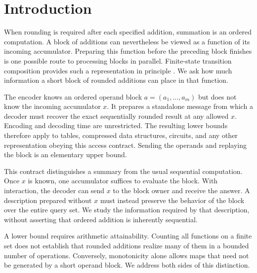 \documentclass[11pt,reqno]{amsart}
\theoremstyle{definition}
\theoremstyle{remark}
\numberwithin{equation}{section}
\begin{document}
\section{Introduction}\label{sec:introduction}

When rounding is required after each specified addition, summation is an
ordered computation. A block of additions can nevertheless be viewed as a
function of its incoming accumulator. Preparing this function before the
preceding block finishes is one possible route to processing blocks in
parallel. Finite-state transition composition provides such a representation
in principle \cite{ref1,ref2}. We ask how much information a short block of rounded additions can place
in that function.

The encoder knows an ordered operand block $a=(a_1,\ldots,a_m)$ but does not
know the incoming accumulator $x$. It prepares a standalone message from which
a decoder must recover the exact sequentially rounded result at any allowed
$x$. Encoding and decoding time are unrestricted. The resulting lower bounds
therefore apply to tables, compressed data structures, circuits, and any other
representation obeying this access contract. Sending the operands and
replaying the block is an elementary upper bound.

This contract distinguishes a summary from the usual sequential computation.
Once $x$ is known, one accumulator suffices to evaluate the block. With
interaction, the decoder can send $x$ to the block owner and receive the
answer. A description prepared without $x$ must instead preserve the behavior
of the block over the entire query set. We study the information required by
that description, without asserting that ordered addition is inherently
sequential.

A lower bound requires arithmetic attainability.
Counting all functions on a finite set does not establish that rounded
additions realize many of them in a bounded number of operations. Conversely,
monotonicity alone allows maps that need not be generated by a short operand
block. We address both sides of this distinction.
\end{document}
